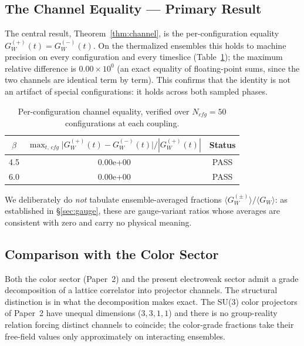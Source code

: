 \documentclass[12pt,a4paper]{article}
\newcommand{\GW}[1]{G_W^{(#1)}}
\def\mathrm#1{#1}%
\begin{document}
	\subsection{The Channel Equality --- Primary Result}
	
	The central result, Theorem~\ref{thm:channel}, is the per-configuration equality
	$\GW{+}(t)=\GW{-}(t)$. On the thermalized ensembles this holds to machine precision
	on every configuration and every timeslice (Table~\ref{tab:channel}); the maximum
	relative difference is $0.00\times10^0$ (an exact equality of floating-point sums,
	since the two channels are identical term by term). This confirms that the identity
	is not an artifact of special configurations: it holds across both sampled phases.
	
	\begin{table}[htbp]
		\centering
		\caption{Per-configuration channel equality, verified over $N_{\mathrm{cfg}}=50$
			configurations at each coupling.}
		\label{tab:channel}
		\begin{tabular}{ccc}
			\toprule
			$\beta$ &
			$\max_{t,\,\mathrm{cfg}}\bigl|\GW{+}(t)-\GW{-}(t)\bigr|/|\GW{+}(t)|$ & Status\\
			\midrule
			4.5 & 0.00e+00 & PASS\\
			6.0 & 0.00e+00 & PASS\\
			\bottomrule
		\end{tabular}
	\end{table}
	
	\noindent We deliberately do \emph{not} tabulate ensemble-averaged fractions
	$\langle\GW{\pm}\rangle/\langle G_W\rangle$: as established in \S\ref{sec:gauge},
	these are gauge-variant ratios whose averages are consistent with zero and carry no
	physical meaning.
	
	\subsection{Comparison with the Color Sector}
	
	Both the color sector (Paper~2) and the present electroweak sector admit a grade
	decomposition of a lattice correlator into projector channels. The structural
	distinction is in what the decomposition makes exact. The SU(3) color projectors of
	Paper~2 have unequal dimensions ($3,3,1,1$) and there is no group-reality relation
	forcing distinct channels to coincide; the color-grade fractions take their
	free-field values only approximately on interacting ensembles.
	
\end{document}
